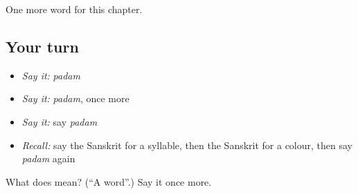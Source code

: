\begin{grammarlens}[title={What you've built}]
One more word for this chapter.
\end{grammarlens}

\subsection*{Your turn}
\begin{itemize}
\raggedright
  \item \emph{Say it:} \emph{padam}
  \item \emph{Say it:} \emph{padam}, once more
  \item \emph{Say it:} say \emph{padam}
  \item \emph{Recall:} say the Sanskrit for a syllable, then the Sanskrit for a colour, then say \emph{padam} again
\end{itemize}

\begin{tcolorbox}[breakable,colback=teal!4,colframe=teal!35!black,title={Before you move on}]
What does  mean? (\textquotedblleft{}A word\textquotedblright{}.) Say it once more.
\end{tcolorbox}
